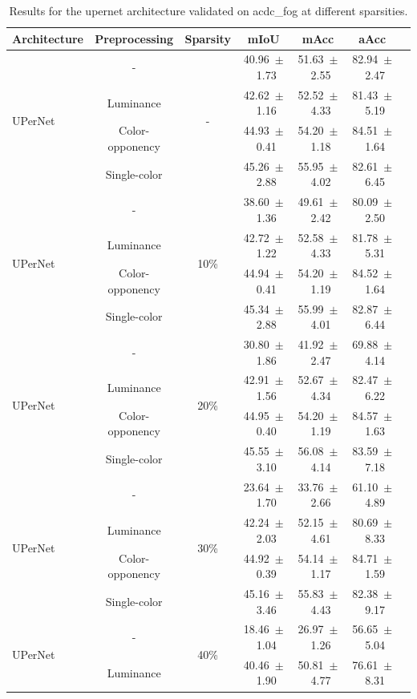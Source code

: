 \begin{table}[h]
\centering
\caption{Results for the upernet architecture validated on acdc_fog at different sparsities.}
\begin{tabular}{@{}lccc ccc@{}}
\toprule
Architecture & Preprocessing & Sparsity & mIoU & mAcc & aAcc \\
\midrule

\multirow{4}{*}{UPerNet} & - & \multirow{4}{*}{-} & 40.96~$\pm$~1.73 & 51.63~$\pm$~2.55 & 82.94~$\pm$~2.47 \\
& Luminance & & 42.62~$\pm$~1.16 & 52.52~$\pm$~4.33 & 81.43~$\pm$~5.19 \\
& Color-opponency & & 44.93~$\pm$~0.41 & 54.20~$\pm$~1.18 & 84.51~$\pm$~1.64 \\
& Single-color & & 45.26~$\pm$~2.88 & 55.95~$\pm$~4.02 & 82.61~$\pm$~6.45 \\
\midrule
\multirow{4}{*}{UPerNet} & - & \multirow{4}{*}{10\%} & 38.60~$\pm$~1.36 & 49.61~$\pm$~2.42 & 80.09~$\pm$~2.50 \\
& Luminance & & 42.72~$\pm$~1.22 & 52.58~$\pm$~4.33 & 81.78~$\pm$~5.31 \\
& Color-opponency & & 44.94~$\pm$~0.41 & 54.20~$\pm$~1.19 & 84.52~$\pm$~1.64 \\
& Single-color & & 45.34~$\pm$~2.88 & 55.99~$\pm$~4.01 & 82.87~$\pm$~6.44 \\
\midrule
\multirow{4}{*}{UPerNet} & - & \multirow{4}{*}{20\%} & 30.80~$\pm$~1.86 & 41.92~$\pm$~2.47 & 69.88~$\pm$~4.14 \\
& Luminance & & 42.91~$\pm$~1.56 & 52.67~$\pm$~4.34 & 82.47~$\pm$~6.22 \\
& Color-opponency & & 44.95~$\pm$~0.40 & 54.20~$\pm$~1.19 & 84.57~$\pm$~1.63 \\
& Single-color & & 45.55~$\pm$~3.10 & 56.08~$\pm$~4.14 & 83.59~$\pm$~7.18 \\
\midrule
\multirow{4}{*}{UPerNet} & - & \multirow{4}{*}{30\%} & 23.64~$\pm$~1.70 & 33.76~$\pm$~2.66 & 61.10~$\pm$~4.89 \\
& Luminance & & 42.24~$\pm$~2.03 & 52.15~$\pm$~4.61 & 80.69~$\pm$~8.33 \\
& Color-opponency & & 44.92~$\pm$~0.39 & 54.14~$\pm$~1.17 & 84.71~$\pm$~1.59 \\
& Single-color & & 45.16~$\pm$~3.46 & 55.83~$\pm$~4.43 & 82.38~$\pm$~9.17 \\
\midrule
\multirow{4}{*}{UPerNet} & - & \multirow{4}{*}{40\%} & 18.46~$\pm$~1.04 & 26.97~$\pm$~1.26 & 56.65~$\pm$~5.04 \\
& Luminance & & 40.46~$\pm$~1.90 & 50.81~$\pm$~4.77 & 76.61~$\pm$~8.31 \\

\end{tabular}
\end{table}
